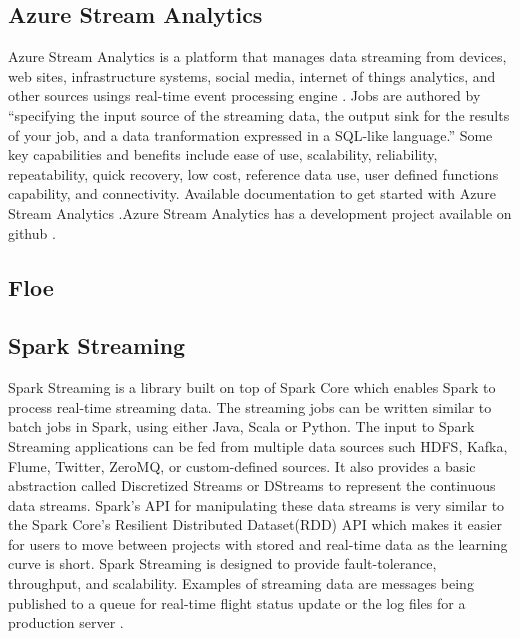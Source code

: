 \subsection{Azure Stream Analytics}

     Azure Stream Analytics is a platform that manages data streaming
     from devices, web sites, infrastructure systems, social media,
     internet of things analytics, and other sources usings real-time
     event processing engine \cite{www-azurestreamanalytics}. Jobs
     are authored by ``specifying the input source of the streaming
     data, the output sink for the results of your job, and a data
     tranformation expressed in a SQL-like language.''  Some key
     capabilities and benefits include ease of use, scalability,
     reliability, repeatability, quick recovery, low cost, reference
     data use, user defined functions capability, and
     connectivity. Available documentation
     to get started with Azure Stream
     Analytics \cite{www-docs-microsoft}.Azure Stream Analytics has a
     development project available on github \cite{www-github-azure}.

     \pv

     
\subsection{Floe}

\pv 

\subsection{Spark Streaming}

     Spark Streaming is a library built on top of Spark Core which
     enables Spark to process real-time streaming data. The streaming
     jobs can be written similar to batch jobs in Spark, using either
     Java, Scala or Python. The input to Spark Streaming applications
     can be fed from multiple data sources such HDFS, Kafka, Flume,
     Twitter, ZeroMQ, or custom-defined sources. It also provides a
     basic abstraction called Discretized Streams or DStreams to
     represent the continuous data streams. Spark's API for
     manipulating these data streams is very similar to the Spark
     Core’s Resilient Distributed Dataset(RDD) API
     which makes it easier for users to
     move between projects with stored and real-time data as the
     learning curve is short\cite{www-apache-spark-RDD}.
     Spark Streaming is designed to provide
     fault-tolerance, throughput, and scalability. Examples of
     streaming data are messages being published to a queue for
     real-time flight status update or the log files for a production
     server \cite{www-apache-spark-stream}.

